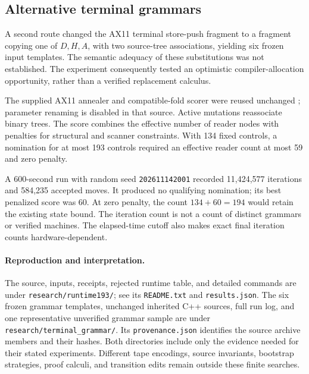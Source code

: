 \subsection{Alternative terminal grammars}

A second route changed the AX11 terminal store-push fragment to a fragment
copying one of \(D,H,A\), with two source-tree associations, yielding six
frozen input templates. The semantic adequacy of these substitutions was
not established. The experiment consequently tested an optimistic
compiler-allocation opportunity, rather than a verified replacement
calculus.

The supplied AX11 annealer and compatible-fold scorer were reused unchanged
\cite{ax11packet}; parameter renaming is disabled in that source. Active
mutations reassociate binary trees. The score combines the effective number
of reader nodes with penalties for structural and scanner constraints.
With 134 fixed controls, a nomination for at most 193 controls required an
effective reader count at most 59 and zero penalty.

A 600-second run with random seed \texttt{202611142001} recorded
11,424,577 iterations and 584,235 accepted moves. It produced no qualifying
nomination; its best penalized score was 60. At zero penalty, the count
\(134+60=194\) would retain the existing state bound. The iteration count
is not a count of distinct grammars or verified machines. The elapsed-time
cutoff also makes exact final iteration counts hardware-dependent.

\paragraph{Reproduction and interpretation.}
The source, inputs, receipts, rejected runtime table, and detailed commands
are under \texttt{research/runtime193/}; see its \texttt{README.txt} and
\texttt{results.json}. The six frozen grammar templates, unchanged inherited
C++ sources, full run log, and one representative unverified grammar sample
are under \texttt{research/terminal\_grammar/}. Its \texttt{provenance.json}
identifies the source archive members and their hashes. Both directories
include only the evidence needed for their stated experiments. Different
tape encodings, source invariants, bootstrap strategies, proof calculi, and
transition edits remain outside these finite searches.

